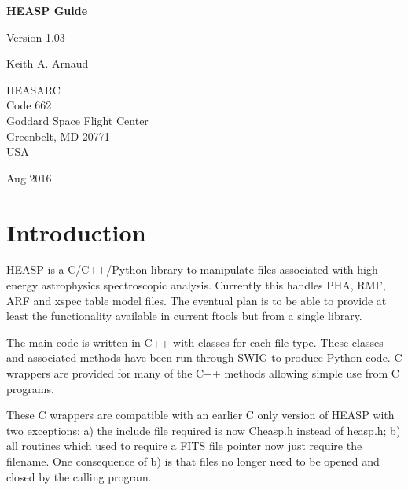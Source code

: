 \documentclass[11pt]{book}
\begin{document}
\begin{titlepage}
\normalsize
\vspace*{4.0cm}
\begin{center}
{\Huge \bf HEASP Guide}\\
\end{center}
\medskip
\medskip
\begin{center}
{\Large Version 1.03 \\}
\end{center}
\bigskip
\begin{center}
{\Large Keith A. Arnaud \\}
\end{center}
\medskip
\medskip
\begin{center}
{HEASARC\\
Code 662\\
Goddard Space Flight Center\\
Greenbelt, MD 20771\\
USA}
\end{center}

\vfill
\bigskip
\begin{center}
{\Large Aug 2016\\}
\end{center}
\vfill
\end{titlepage}


\tableofcontents
{}
\chapter{Introduction}

HEASP is a C/C++/Python library to manipulate files associated with
high energy astrophysics spectroscopic analysis. Currently this
handles PHA, RMF, ARF and xspec table model files. The eventual plan 
is to be able to provide at least the functionality available in 
current ftools but from a single library.

The main code is written in C++ with classes for each file type. These
classes and associated methods have been run through SWIG to produce
Python code. C wrappers are provided for many of the C++ methods
allowing simple use from C programs.

These C wrappers are compatible
with an earlier C only version of HEASP with two exceptions: a) the
include file required is now Cheasp.h instead of heasp.h; b) all
routines which used to require a FITS file pointer now just require
the filename. One consequence of b) is that files no longer need to be
opened and closed by the calling program.
\end{document}
